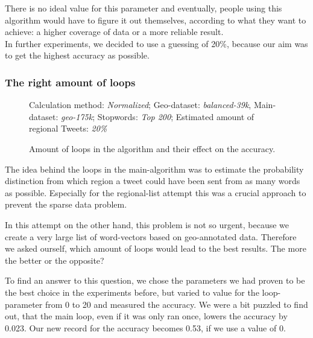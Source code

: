 \documentclass[../Main.tex]{subfiles}
\begin{document}
There is no ideal value for this parameter and eventually, people using this algorithm would have to figure it out themselves, according to what they want to achieve: a higher coverage of data or a more reliable result. \\
In further experiments, we decided to use a guessing of 20\%, because our aim was to get the highest accuracy as possible.

\subsubsection{The right amount of loops}
\begin{figure}

Calculation method: \textit{Normalized}; Geo-dataset: \textit{balanced-39k}, Main-dataset: \textit{geo-175k}; Stopwords: \textit{Top 200}; Estimated amount of regional Tweets: \textit{20\%}
  \caption{Amount of loops in the algorithm and their effect on the accuracy.}
  \label{geo_graph3}
\end{figure}
The idea behind the loops in the main-algorithm was to estimate the probability distinction from which region a tweet could have been sent from as many words as possible. Especially for the regional-list attempt this was a crucial approach to prevent the sparse data problem.


In this attempt on the other hand, this problem is not so urgent, because we create a very large list of word-vectors based on geo-annotated data. Therefore we asked ourself, which amount of loops would lead to the best results. The more the better or the opposite? 

To find an answer to this question, we chose the parameters we had proven to be the best choice in the experiments before, but varied to value for the loop-parameter from 0 to 20 and measured the accuracy. 
We were a bit puzzled to find out, that the main loop, even if it was only ran once, lowers the accuracy by 0.023. Our new record for the accuracy becomes 0.53, if we use a value of 0. 
\end{document}
